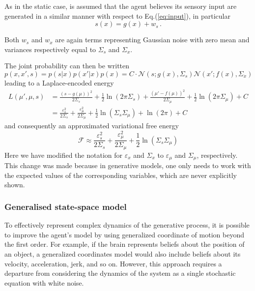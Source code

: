 \documentclass[10pt]{article}
\begin{document}
As in the static case, is assumed that the agent believes its sensory input are generated in a similar manner with respect to Eq.(\ref{eq:input}), in particular
\begin{equation}
s(x) = g(x) + w_s \, .
\label{eqn:s}
\end{equation}

Both $w_s$ and $w_{x}$ are again terms representing Gaussian noise with zero mean and variances respectively equal to $\Sigma_s$ and $\Sigma_{x}$. 

The joint probability can then be written
\begin{equation}
p(x, x', s) = p(s|x) p(x'|x) p(x) = C \cdot \mathcal{N}(s;g(x),\Sigma_s) \mathcal{N}(x';f(x),\Sigma_{\dot{x}})
\label{eq:joint_dynam}
\end{equation}
leading to a Laplace-encoded energy
\begin{equation}
\begin{split}
L(\mu', \mu, s) &=  \frac{(s-g(\mu))^2}{2 \Sigma_{s}} + \frac{1}{2} \ln (2 \pi \Sigma_{s})+ \frac{(\mu'-f(\mu))^2}{2 \Sigma_{\mu}} + \frac{1}{2} \ln (2 \pi \Sigma_{\mu}) + C \\
	&= \frac{\varepsilon_{s}^2}{2 \Sigma_{s}} + \frac{\varepsilon_{\mu}^2}{2 \Sigma_{\mu}} + \frac{1}{2} \ln (\Sigma_{s}\Sigma_{\mu}) + \ln(2 \pi) + C
\end{split}
\end{equation}
and consequently an approximated variational free energy
\begin{equation}
    \mathcal{F} \approx \frac{\varepsilon_{s}^2}{2 \Sigma_{s}} + \frac{\varepsilon_{\mu}^2}{2 \Sigma_{\mu}} + \frac{1}{2} \ln (\Sigma_{s}\Sigma_{\mu})
\end{equation}
Here we have modified the notation for $\varepsilon_{x}$ and $\Sigma_x$ to $\varepsilon_{\mu}$ and $\Sigma_{\mu}$, respectively. This change was made because in generative models, one only needs to work with the expected values of the corresponding variables, which are never explicitly shown.

\subsubsection{Generalised state-space model}
To effectively represent complex dynamics of the generative process, it is possible to improve the agent’s model by using generalized coordinate of motion \citep{Friston2010a, Friston2008a} beyond the first order. 
For example, if the brain represents beliefs about the position of an object, a generalized coordinates model would also include beliefs about its velocity, acceleration, jerk, and so on. However, this approach requires a departure from considering the dynamics of the system as a single stochastic equation with white noise. 
\end{document}
